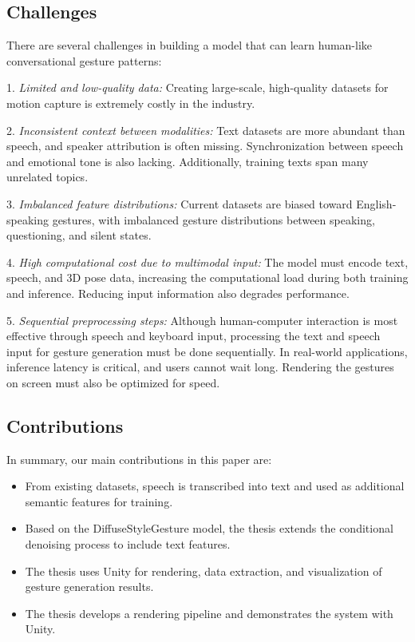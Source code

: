 \subsection{Challenges}
\label{sec:difficult}

There are several challenges in building a model that can learn human-like conversational gesture patterns:

1. \textit{Limited and low-quality data:} Creating large-scale, high-quality datasets for motion capture is extremely costly in the industry.

2. \textit{Inconsistent context between modalities:} Text datasets are more abundant than speech, and speaker attribution is often missing. Synchronization between speech and emotional tone is also lacking. Additionally, training texts span many unrelated topics.

3. \textit{Imbalanced feature distributions:} Current datasets are biased toward English-speaking gestures, with imbalanced gesture distributions between speaking, questioning, and silent states.

4. \textit{High computational cost due to multimodal input:} The model must encode text, speech, and 3D pose data, increasing the computational load during both training and inference. Reducing input information also degrades performance.

5. \textit{Sequential preprocessing steps:} Although human-computer interaction is most effective through speech and keyboard input, processing the text and speech input for gesture generation must be done sequentially. In real-world applications, inference latency is critical, and users cannot wait long. Rendering the gestures on screen must also be optimized for speed.

\subsection{Contributions}

 In summary, our main contributions in this paper are:
 
\begin{itemize}
	\item From existing datasets, speech is transcribed into text and used as additional semantic features for training.
	
	\item Based on the DiffuseStyleGesture model, the thesis extends the conditional denoising process to include text features.
	
	\item The thesis uses Unity for rendering, data extraction, and visualization of gesture generation results.
	
	\item The thesis develops a rendering pipeline and demonstrates the system with Unity.
\end{itemize}




